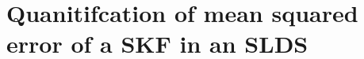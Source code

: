 \documentclass[journal]{IEEEtran}
\begin{document}




 \section{Quanitifcation of mean squared error of a SKF in an SLDS}\label{section:error}
\end{document}
